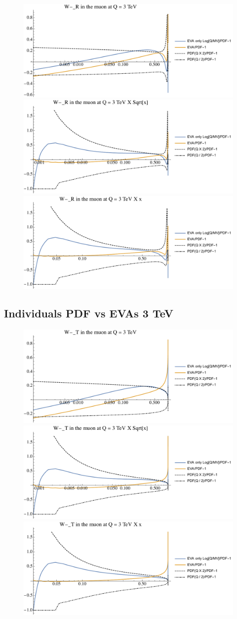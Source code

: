 \documentclass[a4paper,11pt]{article}
\begin{document}
\begin{figure}[ht]
\includegraphics[width=0.46\linewidth]{PlotPDFs/ratios/3TeV/W-_R_Q.pdf}
\includegraphics[width=0.46\linewidth]{PlotPDFs/ratios/3TeV/W-_R_Qsqrtx.pdf}
\includegraphics[width=0.46\linewidth]{PlotPDFs/ratios/3TeV/W-_R_Qx.pdf}
\end{figure}

\clearpage
\subsection{Individuals PDF vs EVAs 3 TeV}

\begin{figure}[ht]
\includegraphics[width=0.46\linewidth]{PlotPDFs/ratios/3TeV/W-_T_Q.pdf}
\includegraphics[width=0.46\linewidth]{PlotPDFs/ratios/3TeV/W-_T_Qsqrtx.pdf}
\includegraphics[width=0.46\linewidth]{PlotPDFs/ratios/3TeV/W-_T_Qx.pdf}
\end{figure}
\end{document}
